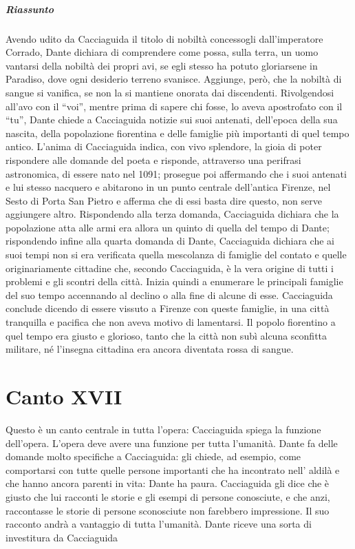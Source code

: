 \documentclass[a4paper, twoside, titlepage]{book}
\begin{document}
\paragraph{Riassunto} Avendo udito da Cacciaguida il titolo di nobiltà concessogli dall’imperatore Corrado, Dante dichiara di comprendere come possa, sulla terra, un uomo vantarsi della nobiltà dei propri avi, se egli stesso ha potuto gloriarsene in Paradiso, dove ogni desiderio terreno svanisce. Aggiunge, però, che la nobiltà di sangue si vanifica, se non la si mantiene onorata dai discendenti.
Rivolgendosi all’avo con il “voi”, mentre prima di sapere chi fosse, lo aveva apostrofato con il “tu”, Dante chiede a Cacciaguida notizie sui suoi antenati, dell’epoca della sua nascita, della popolazione fiorentina e delle famiglie più importanti di quel tempo antico.
L’anima di Cacciaguida indica, con vivo splendore, la gioia di poter rispondere alle domande del poeta e risponde, attraverso una perifrasi astronomica, di essere nato nel 1091; prosegue poi affermando che i suoi antenati e lui stesso nacquero e abitarono in un punto centrale dell’antica Firenze, nel Sesto di Porta San Pietro e afferma che di essi basta dire questo, non serve aggiungere altro.
Rispondendo alla terza domanda, Cacciaguida dichiara che la popolazione atta alle armi era allora un quinto di quella del tempo di Dante; rispondendo infine alla quarta domanda di Dante, Cacciaguida dichiara che ai suoi tempi non si era verificata quella mescolanza di famiglie del contato e quelle originariamente cittadine che, secondo Cacciaguida, è la vera origine di tutti i problemi e gli scontri della città. Inizia quindi a enumerare le principali famiglie del suo tempo accennando al declino o alla fine di alcune di esse.
Cacciaguida conclude dicendo di essere vissuto a Firenze con queste famiglie, in una città tranquilla e pacifica che non aveva motivo di lamentarsi. Il popolo fiorentino a quel tempo era giusto e glorioso, tanto che la città non subì alcuna sconfitta militare, né l'insegna cittadina era ancora diventata rossa di sangue.

\chapter{Canto XVII}

Questo è un canto centrale in tutta l'opera: Cacciaguida spiega la funzione dell'opera. L’opera deve avere una funzione per tutta l’umanità. Dante fa delle domande molto specifiche a Cacciaguida: gli chiede, ad esempio, come comportarsi con tutte quelle persone importanti che ha incontrato nell’ aldilà e che hanno ancora parenti in vita: Dante ha paura. Cacciaguida gli dice che è giusto che lui racconti le storie e gli esempi di persone conosciute, e che anzi, raccontasse le storie di persone sconosciute non farebbero impressione.
Il suo racconto andrà a vantaggio di tutta l’umanità.
Dante riceve una sorta di investitura da Cacciaguida
\end{document}

